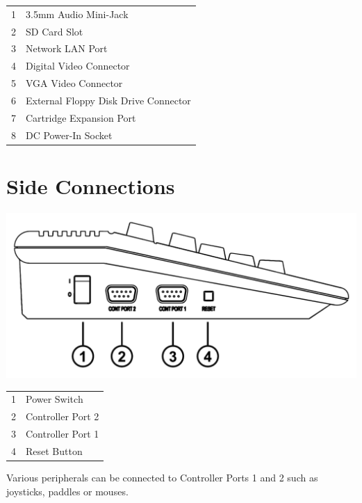 \begin{center}
\begin{longtable}{ c | l}
	1	& 	3.5mm Audio Mini-Jack \\
	2	& 	SD Card Slot\\
	3	& 	Network LAN Port \\
	4	& 	Digital Video Connector \\
	5	& 	VGA Video Connector \\
	6	& 	External Floppy Disk Drive Connector \\
	7	& 	Cartridge Expansion Port \\
	8	& 	DC Power-In Socket \\
\end{longtable}
\end{center}

\vspace{-1cm}

\section{Side Connections}

\includegraphics[width=\linewidth]{images/illustrations/mega65-side.pdf}

\begin{center}
\begin{longtable}{ c | l}
	1	& 	Power Switch \\
	2	& 	Controller Port 2 \\
	3	& 	Controller Port 1 \\
	4	& 	Reset Button \\
\end{longtable}
\end{center}
Various peripherals can be connected to Controller Ports 1 and 2 such as
joysticks, paddles or mouses.

